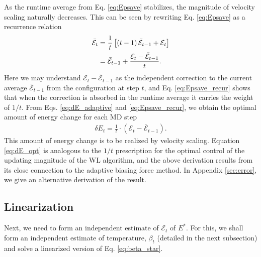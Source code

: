 \documentclass[reprint]{revtex4-1}
\begin{document}
As the runtime average from Eq. \eqref{eq:Epsave}
stabilizes, the magnitude of velocity scaling
naturally decreases.
%
This can be seen by rewriting Eq. \eqref{eq:Epsave}
as a recurrence relation
%
\begin{align}
  \bar{\mathcal E}_t
  &=
  \frac{1}{t}
  \left[
    (t - 1) \, \bar{\mathcal E}_{t - 1}
    + \mathcal E_t
  \right]
  \notag \\
  &=
  \bar{\mathcal E}_{t - 1}
  +
  \frac{
    \mathcal E_t - \bar{\mathcal E}_{t - 1}
  }
  {
    t
  }
  .
\label{eq:Epsave_recur}
\end{align}
%
Here we may understand $\mathcal E_t - \bar{\mathcal E}_{t - 1}$
as the independent correction
to the current average $\bar{\mathcal E}_{t - 1}$
from the configuration at step $t$,
and Eq. \eqref{eq:Epsave_recur} shows that
when the correction is absorbed in the runtime average
it carries the weight of $1/t$.
%
From Eqs. \eqref{eq:dE_adaptive} and \eqref{eq:Epsave_recur},
we obtain the optimal amount of energy change
for each MD step
\begin{align}
  \delta E_t
  =
  \frac{ 1 } { t }
  \cdot
  \left( \mathcal E_t - \bar{\mathcal E}_{t - 1} \right)
  .
  \label{eq:dE_opt}
\end{align}
%
This amount of energy change is to be realized by velocity scaling.
%
Equation \eqref{eq:dE_opt} is analogous to the $1/t$ prescription\cite{
  belardinelli2007, belardinelli2007jcp, belardinelli2008,
  zhou2005, zhou2008, morozov2007}
for the optimal control of the updating magnitude
of the WL algorithm\cite{wang2001, wang2001pre},
and the above derivation results from its close connection\cite{
  marsili2006, barducci2008}
to the adaptive biasing force method\cite{darve2001, darve2008}.
%
In Appendix \ref{sec:error}, we give an alternative derivation of the result.



\subsection{Linearization}



Next, we need to form an independent estimate of
$\mathcal E_t$ of $E^*$.
%
For this, we shall form
an independent estimate of temperature, $\beta_t$
(detailed in the next subsection)
and solve a linearized version of Eq. \eqref{eq:beta_star}.
\end{document}
